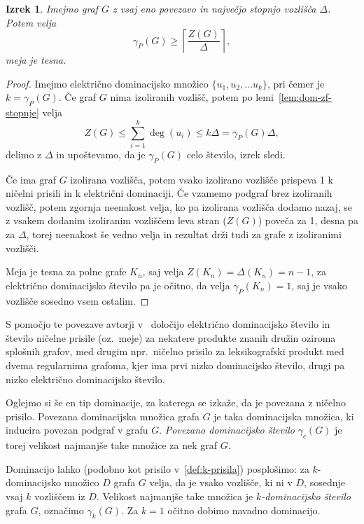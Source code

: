 \documentclass[12pt,a4paper,twoside]{article}
\theoremstyle{definition} %
\theoremstyle{plain} %
\newtheorem{izrek}[definicija]{Izrek}
\numberwithin{equation}{section}  %
\begin{document}
\begin{izrek}{{\cite[izrek 3.2]{benson2015power}}}
    Imejmo graf $G$ z vsaj eno povezavo in največjo stopnjo vozlišča $\Delta$. Potem velja
    \[ \gamma_P(G) \geq \left\lceil \frac{Z(G)}{\Delta} \right\rceil, \]
    meja je tesna.
\end{izrek}
\begin{proof}
    Imejmo električno dominacijsko množico $\{u_1, u_2, \ldots u_k \}$, pri čemer je $k = \gamma_P(G)$. Če graf $G$ nima izoliranih vozlišč, potem po lemi~\ref{lem:dom-zf-stopnje} velja
    \[ Z(G) \leq \sum_{i=1}^{k} \deg(u_i) \leq k \Delta = \gamma_P(G) \Delta, \]
    delimo z $\Delta$ in upoštevamo, da je $\gamma_P(G)$ celo število, izrek sledi.

    Če ima graf $G$ izolirana vozlišča, potem vsako izolirano vozlišče prispeva 1 k ničelni prisili in k električni dominaciji. Če vzamemo podgraf brez izoliranih vozlišč, potem zgornja neenakost velja, ko pa izolirana vozlišča dodamo nazaj, se z vsakem dodanim izoliranim vozliščem leva stran ($Z(G)$) poveča za 1, desna pa za $\Delta$, torej neenakost še vedno velja in rezultat drži tudi za grafe z izoliranimi vozlišči.

    Meja je tesna za polne grafe $K_n$, saj velja $Z(K_n) = \Delta(K_n) = n-1$, za električno dominacijsko število pa je očitno, da velja $\gamma_P(K_n) = 1$, saj je vsako vozlišče sosedno vsem ostalim.
\end{proof}

S pomočjo te povezave avtorji v~\cite{benson2015power} določijo električno dominacijsko število in število ničelne prisile (oz.~meje) za nekatere produkte znanih družin oziroma splošnih grafov, med drugim npr.~ničelno prisilo za leksikografski produkt med dvema regularnima grafoma, kjer ima prvi nizko dominacijsko število, drugi pa nizko električno dominacijsko število.

Oglejmo si še en tip dominacije, za katerega se izkaže, da je povezana z ničelno prisilo. Povezana dominacijska množica grafa $G$ je taka dominacijska množica, ki inducira povezan podgraf v grafu $G$. \emph{Povezano dominacijsko število} $\gamma_c(G)$ je torej velikost najmanjše take množice za nek graf $G$.

Dominacijo lahko (podobno kot prisilo v~\ref{def:k-prisila}) posplošimo: za $k$-dominacijsko množico $D$ grafa $G$ velja, da je vsako vozlišče, ki ni v $D$, sosednje vsaj $k$ vozliščem iz $D$. Velikost najmanjše take množica je \emph{$k$-dominacijsko število} grafa $G$, označimo $\gamma_k(G)$. Za $k = 1$ očitno dobimo navadno dominacijo.
\end{document}
